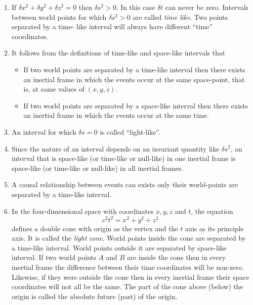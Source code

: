 \begin{enumerate}
\item If $\delta x^2 + \delta y^2 + \delta z^2 = 0$ then $\delta s^2 > 0$. In this
case $\delta t$ can never be zero. Intervals between world points for which 
$\delta s^2 > 0$ are called \emph{time like}. Two points separated by a time-
like interval will always have different ``time'' coordinates.

\item It follows from the definitions of time-like and space-like intervals that
\begin{itemize}
\item If two world points are separated by a time-like interval then there exists
an inertial frame in which the events occur at the same space-point, that is, at
same values of $(x, y, z)$.
\item If two world points are separated by a space-like interval then there exists
an inertial frame in which the events occur at the same time.
\end{itemize}

\item An interval for which $\delta s = 0$ is called ``light-like''.

\item Since the nature of an interval depends on an invariant quantity like
$\delta s^2$, an interval that is space-like (or time-like or null-like) in one
inertial frame is space-like (or time-like or null-like) in all inertial frames.

\item A causal relationship between events can exists only their world-points
are separated by a time-like interval.

\item In the four-dimensional space with coordinates $x, y, z$ and $t$, the equation
\begin{equation}\label{c1e6}
c^2t^2 = x^2 + y^2 + z^2
\end{equation}
defines a double cone with origin as the vertex and the $t$ axis as its principle
axis. It is called the \emph{light cone}. 
World points inside the cone are separated by a time-like interval. World
points outside it are separated by space-like interval. If two world points $A$
and $B$ are inside the cone then in every inertial frame the difference between
their time coordinates will be non-zero. Likewise, if they were outside the cone
then in every inertial frame their space coordinates will not all be the same.
The part of the cone above (below) the origin is called the absolute future 
(past) of the origin.
\end{enumerate}

